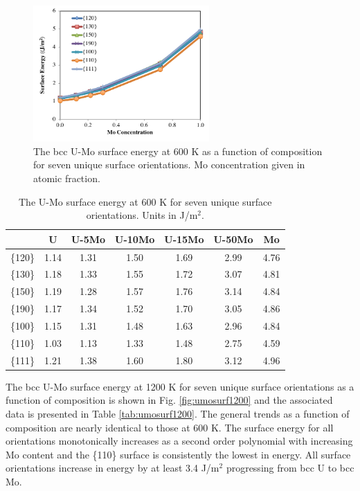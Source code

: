 \documentclass[review]{elsarticle}
\begin{document}
\begin{figure}[h]
 \centering
 \includegraphics[width=0.6\textwidth]{umosurf600.png} 
 \caption{The bcc U-Mo surface energy at 600 K as a function of composition for seven unique surface orientations. Mo concentration given in atomic fraction.}
 \label{fig:umosurf600}
\end{figure}

\begin{table}[h]
\caption{The U-Mo surface energy at 600 K for seven unique surface orientations. Units in J/m$^{2}$. } \label{tab:umosurf600}
\begin{center}
\begin{tabular}{|c|c|c|c|c|c|c|}
	\hline
 & U & U-5Mo & U-10Mo & U-15Mo & U-50Mo & Mo \\
\hline
\{120\} & 1.14 & 1.31 & 1.50 & 1.69 & 2.99 & 4.76 \\
\{130\}	 & 1.18 & 1.33 & 1.55 & 1.72 & 3.07 & 4.81 \\ 
\{150\}	 & 1.19 & 1.28 & 1.57 & 1.76 & 3.14 & 4.84 \\
\{190\}	 & 1.17 & 1.34 & 1.52 & 1.70 & 3.05 & 4.86 \\
\{100\}	 & 1.15 & 1.31 & 1.48 & 1.63 & 2.96 & 4.84 \\
\{110\}	 & 1.03 & 1.13 & 1.33 & 1.48 & 2.75 & 4.59 \\
\{111\}	 & 1.21 & 1.38 & 1.60 & 1.80 & 3.12 & 4.96 \\
 	 \hline
\end{tabular}
\end{center}
\label{default}
\end{table}

\FloatBarrier

The bcc U-Mo surface energy at 1200 K for seven unique surface orientations as a function of composition is shown in Fig. \ref{fig:umosurf1200} and the associated data is presented in Table \ref{tab:umosurf1200}. The general trends as a function of composition are nearly identical to those at 600 K. The surface energy for all orientations monotonically increases as a second order polynomial with increasing Mo content and the \{110\} surface is consistently the lowest in energy. All surface orientations increase in energy by at least 3.4 J/m$^{2}$ progressing from bcc U to bcc Mo. 
\end{document}
